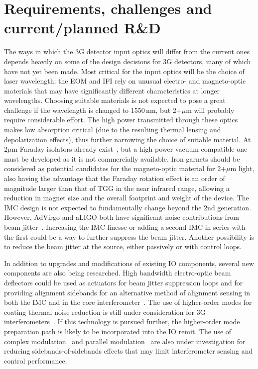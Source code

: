 \section{Requirements, challenges and current/planned R\&D}
 The ways in which the 3G detector input optics will differ from the current ones depends heavily on some of the design decisions for 3G detectors, many of which have not yet been made. Most critical for the input optics will be the choice of laser wavelength; the EOM and IFI rely on unusual electro- and magneto-optic materials that may have significantly different characteristics at longer wavelengths. Choosing suitable materials is not expected to pose a great challenge if the wavelength is changed to 1550\,nm, but 2+$\mu$m will probably require considerable effort. The high power transmitted through these optics makes low absorption critical (due to the resulting thermal lensing and depolarization effects), thus further narrowing the choice of suitable material. At 2$\mu$m Faraday isolators already exist~\cite{EOTFI}, but a high power vacuum compatible one must be developed as it is not commercially available. Iron garnets should be considered as potential candidates for the magneto-optic material for 2+$\mu$m light, also having the advantage that the Faraday rotation effect is an order of magnitude larger than that of TGG in the near infrared range, allowing a reduction in magnet size and the overall footprint and weight of the device.
The IMC design is not expected to fundamentally change beyond the 2nd generation.  However, AdVirgo and aLIGO both have significant noise contributions from beam jitter~\cite{aLIGOjitter,adVirgojitter}. Increasing the IMC finesse or adding a second IMC in series with the first could be a way to further suppress the beam jitter. Another possibility is to reduce the beam jitter at the source, either passively or with 
control loops.  

In addition to upgrades and modifications of existing IO components, several new components are also being researched. High bandwidth electro-optic beam deflectors could be used as actuators for beam jitter suppression loops and for providing alignment sidebands for an alternative method of alignment sensing in both the IMC and in the core interferometer~\cite{RFJASC}. The use of higher-order modes for coating thermal noise reduction is still under consideration for 3G interferometers~\cite{LGmodes}. If this technology is pursued further, the higher-order mode preparation path is likely to be incorporated into the IO remit. The use of complex modulation~\cite{complexmod} and parallel modulation~\cite{kagraMZI} are also under investigation for reducing sidebands-of-sidebands effects that may limit interferometer sensing and control performance.

